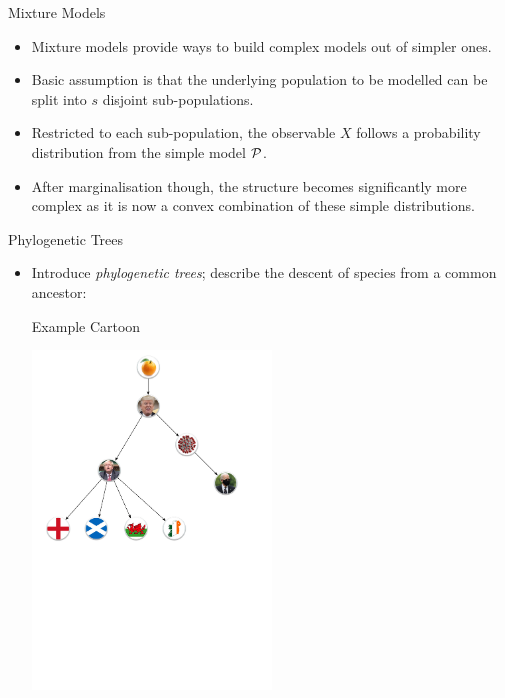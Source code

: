 \begin{frame}{Mixture Models}

    \begin{itemize}
    \item Mixture models provide ways to build complex models out of simpler ones.

    \item Basic assumption is that the underlying population to be modelled can be split into $s$ disjoint sub-populations.

    \item Restricted to each sub-population, the observable $X$ follows a probability distribution from the simple model $\mathcal{P}$.

    \item After marginalisation though, the structure becomes significantly more complex as it is now a convex combination of these simple distributions.

    \end{itemize}

\end{frame}

\begin{frame}{Phylogenetic Trees}

    \begin{itemize}
        \item Introduce \emph{phylogenetic trees}; describe the descent of species from a common ancestor:        
        \begin{block}{Example Cartoon}

        \begin{center}
        \includegraphics[width=0.5\textwidth, angle=0]{resources/phylogenetic-tree.pdf}
        \end{center}
        \end{block}

    \end{itemize}

\end{frame}

